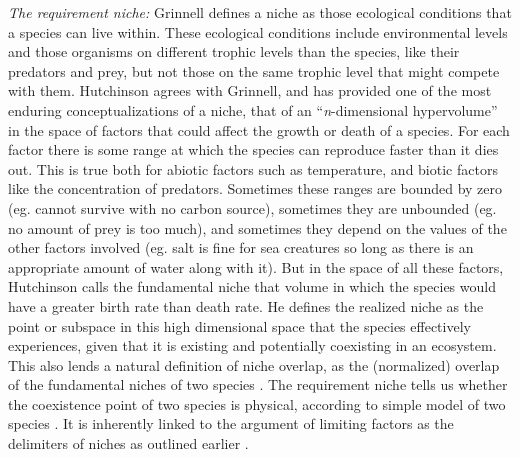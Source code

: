 \emph{The requirement niche:}
Grinnell \cite{Grinnell1917} defines a niche as those ecological conditions that a species can live within. 
These ecological conditions include environmental levels and those organisms on different trophic levels than the species, like their predators and prey, but not those on the same trophic level that might compete with them.
Hutchinson \cite{Hutchinson1961} agrees with Grinnell, and has provided one of the most enduring conceptualizations of a niche, that of an ``\emph{n}-dimensional hypervolume'' in the space of factors that could affect the growth or death of a species.
For each factor there is some range at which the species can reproduce faster than it dies out.
This is true both for abiotic factors such as temperature, and biotic factors like the concentration of predators.
Sometimes these ranges are bounded by zero (eg. cannot survive with no carbon source), sometimes they are unbounded (eg. no amount of prey is too much), and sometimes they depend on the values of the other factors involved (eg. salt is fine for sea creatures so long as there is an appropriate amount of water along with it). 
But in the space of all these factors, Hutchinson calls the fundamental niche that volume in which the species would have a greater birth rate than death rate. 
He defines the realized niche as the point or subspace in this high dimensional space that the species effectively experiences, given that it is existing and potentially coexisting in an ecosystem. 
This also lends a natural definition of niche overlap, as the (normalized) overlap of the fundamental niches of two species \cite{MacArthur1967}. 
The requirement niche tells us whether the coexistence point of two species is physical, according to simple model of two species \cite{Holt1994}. 
It is inherently linked to the argument of limiting factors as the delimiters of niches as outlined earlier \cite{Armstrong1976,McGehee1977a,Armstrong1980}. 

